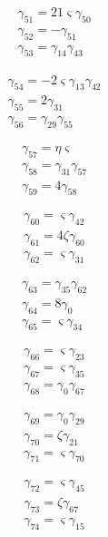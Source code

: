 \[\begin{aligned}\gamma_{51}=21 \varsigma  \gamma_{50}\\ \gamma_{52}=- \gamma_{51}\\ \gamma_{53}=\gamma_{14} \gamma_{43}\end{aligned}\]

\[\begin{aligned}\gamma_{54}=- 2 \varsigma  \gamma_{13} \gamma_{42}\\ \gamma_{55}=2 \gamma_{31}\\ \gamma_{56}=\gamma_{29} \gamma_{55}\end{aligned}\]

\[\begin{aligned}\gamma_{57}=\eta  \varsigma \\ \gamma_{58}=\gamma_{31} \gamma_{57}\\ \gamma_{59}=4 \gamma_{58}\end{aligned}\]

\[\begin{aligned}\gamma_{60}=\varsigma  \gamma_{42}\\ \gamma_{61}=4 \zeta  \gamma_{60}\\ \gamma_{62}=\varsigma  \gamma_{31}\end{aligned}\]

\[\begin{aligned}\gamma_{63}=\gamma_{35} \gamma_{62}\\ \gamma_{64}=8 \gamma_{0}\\ \gamma_{65}=\varsigma  \gamma_{34}\end{aligned}\]

\[\begin{aligned}\gamma_{66}=\varsigma  \gamma_{23}\\ \gamma_{67}=\varsigma  \gamma_{35}\\ \gamma_{68}=\gamma_{0} \gamma_{67}\end{aligned}\]

\[\begin{aligned}\gamma_{69}=\gamma_{0} \gamma_{29}\\ \gamma_{70}=\zeta  \gamma_{21}\\ \gamma_{71}=\varsigma  \gamma_{70}\end{aligned}\]

\[\begin{aligned}\gamma_{72}=\varsigma  \gamma_{45}\\ \gamma_{73}=\zeta  \gamma_{67}\\ \gamma_{74}=\varsigma  \gamma_{15}\end{aligned}\]

